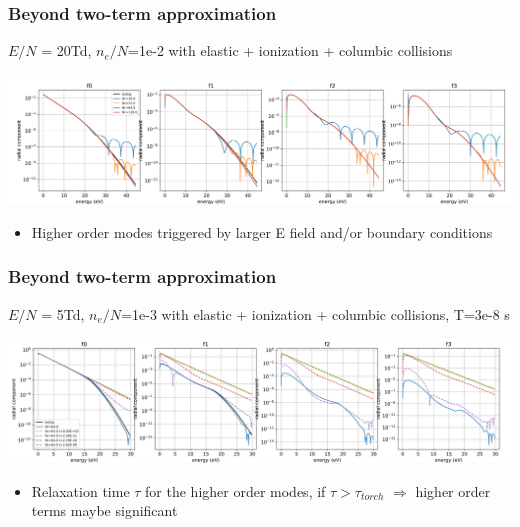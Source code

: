 \documentclass[mathserif, aspectratio=169]{beamer}
\begin{document}
\begin{frame}
	\frametitle{Beyond two-term approximation}
	$E/N$ = 20Td, $n_e/N$=1e-2 with elastic + ionization + columbic collisions
	\begin{center}
		\includegraphics[width=\textwidth]{20Td_lmax3_ion_deg_1e-2.png}
	\end{center}
	\begin{itemize}
		\item Higher order modes triggered by larger E field and/or boundary conditions
	\end{itemize}  
\end{frame}

\begin{frame}
	\frametitle{Beyond two-term approximation}
	$E/N$ = 5Td, $n_e/N$=1e-3 with elastic + ionization + columbic collisions, T=3e-8 s
	\begin{center}
		\includegraphics[width=\textwidth]{5Td_transient_ion_deg_1e-3.png}
	\end{center}
	\begin{itemize}
		\item Relaxation time $\tau$ for the higher order modes, if $\tau > \tau_{torch}$ $\Rightarrow$ higher order terms maybe significant
	\end{itemize}
\end{frame}
\end{document}
